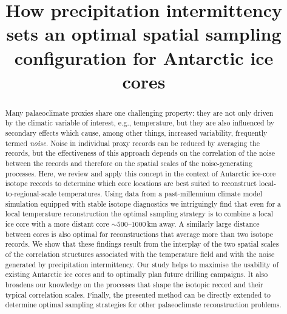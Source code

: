 \documentclass[cp, manuscript]{copernicus}
\begin{document}
\title{How precipitation intermittency sets an optimal spatial sampling
  configuration for Antarctic ice cores}




\received{}
\pubdiscuss{}
\revised{}
\accepted{}
\published{}


\maketitle

\begin{abstract} Many palaeoclimate proxies share one challenging property: they
are not only driven by the climatic variable of interest, e.g., temperature, but
they are also influenced by secondary effects which cause, among other things,
increased variability, frequently termed \emph{noise}. Noise in individual proxy
records can be reduced by averaging the records, but the effectiveness of this
approach depends on the correlation of the noise between the records and
therefore on the spatial scales of the noise-generating processes. Here, we
review and apply this concept in the context of Antarctic ice-core isotope
records to determine which core locations are best suited to reconstruct
local-to-regional-scale temperatures. Using data from a past-millennium climate
model simulation equipped with stable isotope diagnostics we intriguingly find
that even for a local temperature reconstruction the optimal sampling strategy
is to combine a local ice core with a more distant core $\sim500$--$1000$\,km
away. A similarly large distance between cores is also optimal for
reconstructions that average more than two isotope records. We show that these
findings result from the interplay of the two spatial scales of the correlation
structures associated with the temperature field and with the noise generated by
precipitation intermittency. Our study helps to maximise the usability of
existing Antarctic ice cores and to optimally plan future drilling campaigns. It
also broadens our knowledge on the processes that shape the isotopic record and
their typical correlation scales. Finally, the presented method can be directly
extended to determine optimal sampling strategies for other palaeoclimate
reconstruction problems.
\end{abstract}
\end{document}

